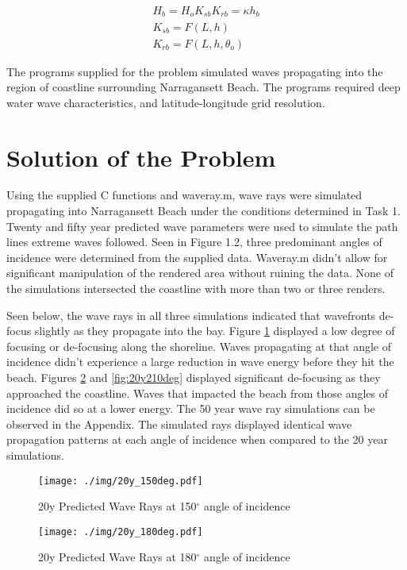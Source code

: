 \begin{align}
H_{b} = H_{o}K_{sb}K_{rb} = \kappa h_{b}
\\ K_{sb} = F(L,h)
\\K_{rb} = F(L,h,\theta_{o})
\label{eq:breaker_char}
\end{align}

The programs supplied for the problem simulated waves propagating into the region of coastline surrounding Narragansett Beach. The programs required deep water wave characteristics, and latitude-longitude grid resolution. 

\section{Solution of the Problem}

Using the supplied C functions and waveray.m, wave rays were simulated propagating into Narragansett Beach under the conditions determined in Task 1. Twenty and fifty year predicted wave parameters were used to simulate the path lines extreme waves followed. Seen in Figure 1.2, three predominant angles of incidence were determined from the supplied data. Waveray.m didn't allow for significant manipulation of the rendered area without ruining the data. None of the simulations intersected the coastline with more than two or three renders.

Seen below, the wave rays in all three simulations indicated that wavefronts de-focus slightly as they propagate into the bay. Figure \ref{fig:20y150deg} displayed a low degree of focusing or de-focusing along the shoreline. Waves propagating at that angle of incidence didn't experience a large reduction in wave energy before they hit the beach. Figures \ref{fig:20y180deg} and \ref{fig:20y210deg} displayed significant de-focusing as they approached the coastline. Waves that impacted the beach from those angles of incidence did so at a lower energy. The 50 year wave ray simulations can be observed in the Appendix. The simulated rays displayed identical wave propagation patterns at each angle of incidence when compared to the 20 year simulations.

\begin{figure}[H]
\centering
\texttt{[image: ./img/20y\_150deg.pdf]}
\caption{20y Predicted Wave Rays at 150$^{\circ}$ angle of incidence}
\label{fig:20y150deg}
\end{figure}


\begin{figure}[H]
\centering
\texttt{[image: ./img/20y\_180deg.pdf]}
\caption{20y Predicted Wave Rays at 180$^{\circ}$ angle of incidence}
\label{fig:20y180deg}
\end{figure}

